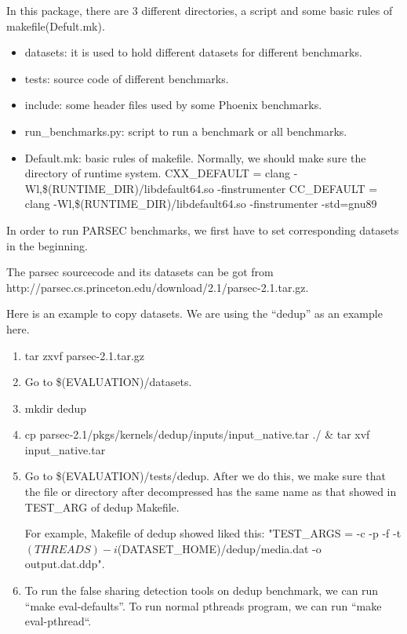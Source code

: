 \documentclass[10pt]{article}
\begin{document}
In this package, there are 3 different directories, a script and some basic rules of makefile(Defult.mk). 
\begin{itemize}
\item
datasets: it is used to hold different datasets for different benchmarks.
\item
tests: source code of different benchmarks.
\item
include: some header files used by some Phoenix benchmarks.

\item
run\_benchmarks.py: script to run a benchmark or all benchmarks. 

\item
Default.mk: basic rules of makefile.
Normally, we should make sure the directory of runtime system. 
CXX\_DEFAULT = clang -Wl,\$(RUNTIME\_DIR)/libdefault64.so -finstrumenter
CC\_DEFAULT = clang -Wl,\$(RUNTIME\_DIR)/libdefault64.so -finstrumenter -std=gnu89


\end{itemize}

In order to run PARSEC benchmarks, we first have to set corresponding datasets in the beginning. 

The parsec sourcecode and its datasets can be got from http://parsec.cs.princeton.edu/download/2.1/parsec-2.1.tar.gz.

Here is an example to copy datasets. We are using the ``dedup'' as an example here.  

\begin{enumerate}
\item
tar zxvf parsec-2.1.tar.gz

\item
Go to \$(EVALUATION)/datasets.

\item
mkdir dedup

\item
cp parsec-2.1/pkgs/kernels/dedup/inputs/input\_native.tar ./ \& tar xvf input\_native.tar


\item 
Go to \$(EVALUATION)/tests/dedup.
After we do this, we make sure that the file or directory after decompressed has the same name as that showed in TEST\_ARG of dedup Makefile.

For example, Makefile of dedup showed liked this:
"TEST\_ARGS = -c -p -f -t $(THREADS) -i $(DATASET\_HOME)/dedup/media.dat -o output.dat.ddp".

\item
To run the false sharing detection tools on dedup benchmark, we can run ``make eval-defaults''. 
To run normal pthreads program, we can run ``make eval-pthread``.

\end{enumerate}


\end{document}
